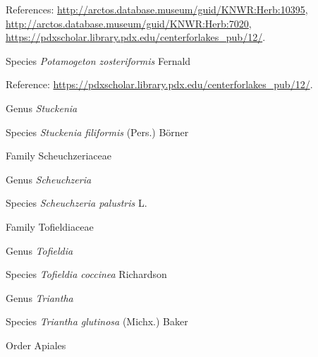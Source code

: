 \documentclass[9pt, article]{memoir}
\begin{document}
\begin{multicols}{2}
\vspace{6pt}References: 
\url{http://arctos.database.museum/guid/KNWR:Herb:10395}, 
\url{http://arctos.database.museum/guid/KNWR:Herb:7020}, 
\url{https://pdxscholar.library.pdx.edu/centerforlakes_pub/12/}.

\vspace{6pt}\noindent\hspace{36pt}Species \textit{Potamogeton zosteriformis} Fernald


\vspace{6pt}Reference: 
\url{https://pdxscholar.library.pdx.edu/centerforlakes_pub/12/}.

\vspace{6pt}\noindent\hspace{30pt}Genus \textit{Stuckenia}


\vspace{6pt}\noindent\hspace{36pt}Species \textit{Stuckenia filiformis} (Pers.) Börner


\vspace{6pt}\noindent\hspace{24pt}Family Scheuchzeriaceae


\vspace{6pt}\noindent\hspace{30pt}Genus \textit{Scheuchzeria}


\vspace{6pt}\noindent\hspace{36pt}Species \textit{Scheuchzeria palustris} L.


\vspace{6pt}\noindent\hspace{24pt}Family Tofieldiaceae


\vspace{6pt}\noindent\hspace{30pt}Genus \textit{Tofieldia}


\vspace{6pt}\noindent\hspace{36pt}Species \textit{Tofieldia coccinea} Richardson


\vspace{6pt}\noindent\hspace{30pt}Genus \textit{Triantha}


\vspace{6pt}\noindent\hspace{36pt}Species \textit{Triantha glutinosa} (Michx.) Baker


\vspace{6pt}\noindent\hspace{18pt}Order Apiales



\end{multicols}
\end{document}
